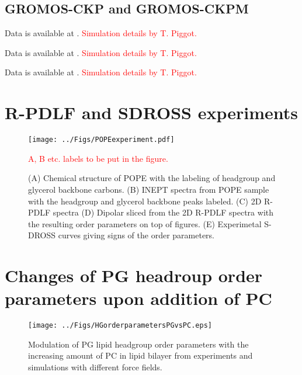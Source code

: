 \documentclass[journal=jpcbfk]{achemso}
\newcommand{\todo}[1]{\textcolor{red}{#1}}
\begin{document}
\subsection{GROMOS-CKP and GROMOS-CKPM}

 Data is available at \cite{gromosCKPpope}. \todo{Simulation details by  T. Piggot.}

 Data is available at \cite{gromosCKPdope}. \todo{Simulation details by  T. Piggot.}

 Data is available at \cite{gromosCKPdppe}. \todo{Simulation details by  T. Piggot.}

\clearpage
\section{R-PDLF and SDROSS experiments}

\begin{figure}[]
  \texttt{[image: ../Figs/POPEexperiment.pdf]}
  \caption{\label{POPEspectra}
    (A) Chemical structure of POPE with the labeling of headgroup and glycerol backbone carbons.
    (B) INEPT spectra from POPE sample with the headgroup and glycerol backbone peaks labeled.
    (C) 2D R-PDLF spectra
    (D) Dipolar sliced from the  2D R-PDLF spectra with the resulting order parameters on top of figures.
    (E) Experimetal S-DROSS curves giving signs of the order parameters.
  }
  \todo{A, B etc. labels to be put in the figure.}
\end{figure}

\clearpage

\section{Changes of PG headroup order parameters upon addition of PC}

\begin{figure}[]
  \centering
  \texttt{[image: ../Figs/HGorderparametersPGvsPC.eps]}
  \caption{\label{HGorderparametersPGvsPC}
    Modulation of PG lipid headgroup order parameters with the increasing amount of PC in lipid bilayer
    from experiments \cite{borle85,macdonald87} and simulations with different force fields.
  }
\end{figure}


\end{document}
